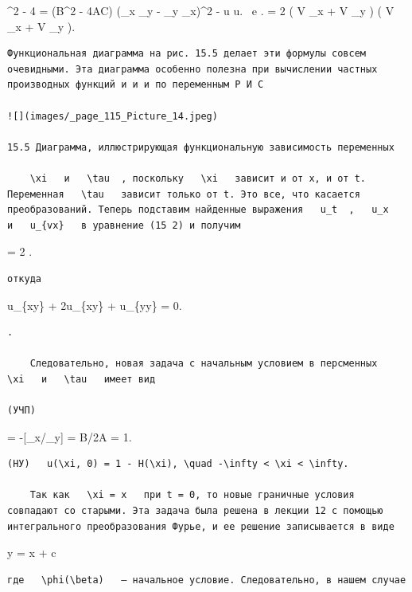 \documentclass[
  ukrainian,
]{article}
\begin{document}
\^{}2 - 4 = (B\^{}2 - 4AC) (\xi\_x
\eta\_y - \xi\_y \eta\_x)\^{}2 - \Pi \rho u u. ~\rho e \partial.
 = 2 \left( V  \xi\_x + V  \xi\_y
\right) \left( V  \eta\_x + V  \eta\_y \right).

\begin{verbatim}
Функциональная диаграмма на рис. 15.5 делает эти формулы совсем очевидными. Эта диаграмма особенно полезна при вычислении частных производных функций и и и по переменным Р И С

![](images/_page_115_Picture_14.jpeg)

15.5 Диаграмма, иллюстрирующая функциональную зависимость переменных

    \xi   и   \tau  , поскольку   \xi   зависит и от x, и от t. Переменная   \tau   зависит только от t. Это все, что касается преобразований. Теперь подставим найденные выражения   u_t  ,   u_x   и   u_{vx}   в уравнение (15 2) и получим
\end{verbatim}

 = 2 
.

\begin{verbatim}
откуда
\end{verbatim}

u\_\{xy\} + 2u\_\{xy\} + u\_\{yy\} = 0.

\begin{verbatim}
.

    Следовательно, новая задача с начальным условием в персменных   \xi   и   \tau   имеет вид

(УЧП)
\end{verbatim}

 = -{[}\xi\_x/\xi\_y{]} = B/2A = 1.

\begin{verbatim}
(НУ)   u(\xi, 0) = 1 - H(\xi), \quad -\infty < \xi < \infty.

    Так как   \xi = x   при t = 0, то новые граничные условия совпадают со старыми. Эта задача была решена в лекции 12 с помощью интегрального преобразования Фурье, и ее решение записывается в виде
\end{verbatim}

y = x + c

\begin{verbatim}
где   \phi(\beta)   — начальное условие. Следовательно, в нашем случае
\end{verbatim}
\end{document}
